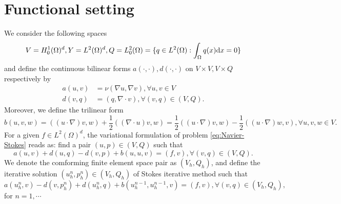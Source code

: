 \section{Functional setting}
We consider the following spaces
\[V=H_0^1(\Omega)^d,Y=L^2(\Omega)^d,Q=L^2_0(\Omega)=\{q\in L^2(\Omega):\int_\Omega q(x)\mathrm{d} x=0\}\]
and define the continuous bilinear forms $a(\cdot,\cdot),d(\cdot,\cdot)$ on $V\times V,V\times Q$ 
respectively by
\[
  \begin{split}
    a(u,v)&=\nu(\nabla u,\nabla v),\forall u,v\in V\\
    d(v,q)&=(q,\nabla\cdot v),\forall (v,q)\in(V,Q).
  \end{split}
  \]
Moreover, we define the trilinear form
\[b(u,v,w)=((u\cdot\nabla)v,w)+\frac{1}{2}((\nabla\cdot u)v,w)=
\frac{1}{2}((u\cdot\nabla)v,w)-\frac{1}{2}((u\cdot\nabla)w,v),\forall u,v,w\in V.\]
For a given $f\in L^2(\Omega)^d$, the variational formulation of problem \eqref{eq:Navier-Stokes} reads as: 
find a pair $(u,p)\in(V,Q)$ such that 
\begin{equation}\label{eq:variational-form}
  a(u,v)+d(u,q)-d(v,p)+b(u,u,v)=(f,v),\forall (v,q)\in(V,Q).
\end{equation}
We denote the comforming finite element space pair as $(V_h,Q_h)$, 
and define the iterative solution $(u^n_h,p^n_h)\in(V_h,Q_h)$ of Stokes iterative method such that
\begin{equation}\label{eq:discrete-variational}
  a(u_h^n,v)-d(v,p^n_h)+d(u_h^n,q)+b(u_h^{n-1},u_h^{n-1},v)=(f,v),\forall (v,q)\in(V_h,Q_h),
\end{equation}
for $n=1,\cdots$

